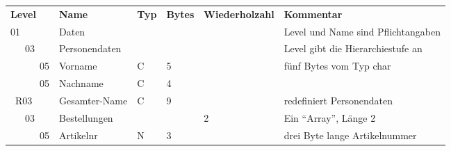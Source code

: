 \begin{tabularx}{\textwidth}{llllll}
\textbf{Level}  & \textbf{Name} & \textbf{Typ} & \textbf{Bytes} & \textbf{Wiederholzahl} & \textbf{Kommentar} \\
01 & Daten & & & & Level und Name sind Pflichtangaben\\
\ \ \ 03 & Personendaten & & & & Level gibt die Hierarchiestufe an\\
\ \ \ \ \ \ 05 & Vorname & C & 5 & & fünf Bytes vom Typ char\\
\ \ \ \ \ \ 05 & Nachname & C & 4 & &\\
\ R03 & Gesamter-Name & C & 9 & & redefiniert Personendaten\\
\ \ \ 03 & Bestellungen & & & 2 & Ein ``Array'', Länge 2\\
\ \ \ \ \ \ 05 & Artikelnr & N & 3 & & drei Byte lange Artikelnummer\\
\end{tabularx}
     
    
